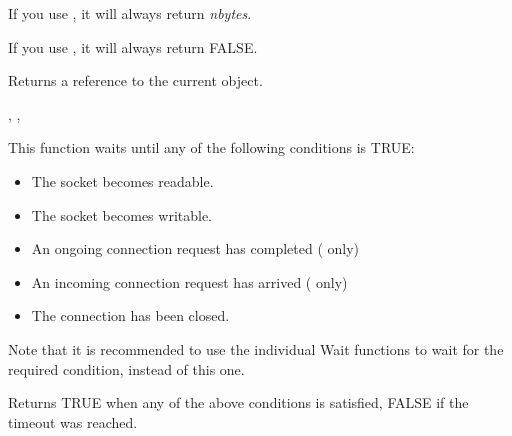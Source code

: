 If you use , it will always return {\it nbytes}.

If you use , it will always return FALSE.





Returns a reference to the current object.


, 
, 

%
%
\label{wxsocketbasewait}


This function waits until any of the following conditions is TRUE:
                                            
\begin{itemize}
\item The socket becomes readable.
\item The socket becomes writable.
\item An ongoing connection request has completed ( only)
\item An incoming connection request has arrived ( only)
\item The connection has been closed.
\end{itemize}

Note that it is recommended to use the individual Wait functions
to wait for the required condition, instead of this one.





Returns TRUE when any of the above conditions is satisfied,
FALSE if the timeout was reached.

